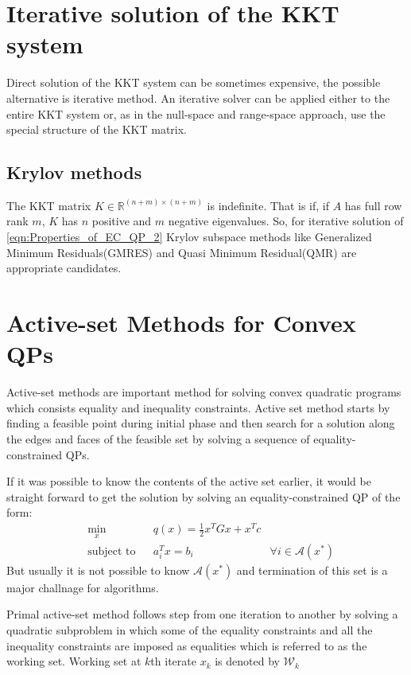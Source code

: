 \section{Iterative solution of the KKT system}
Direct solution of the KKT system can be sometimes expensive, the possible alternative is iterative method. An iterative solver can be applied either to the entire KKT system or, as in the null-space and range-space approach, use the special structure of the KKT matrix.
\subsection*{Krylov methods}
The KKT matrix $K\in \mathbb{R}^{(n+m)\times (n+m)}$ is indefinite. That is if, if $A$ has full row rank $m$, $K$ has $n$ positive and $m$ negative eigenvalues. So, for iterative solution of \ref{eqn:Properties_of_EC_QP_2} Krylov subspace methods like Generalized Minimum Residuals(GMRES) and Quasi Minimum Residual(QMR) are appropriate candidates.




\section{Active-set Methods for Convex QPs}
Active-set methods are important method for solving convex quadratic programs which consists equality and inequality constraints. Active set method starts by finding a feasible point during initial phase and then search for a solution along the edges and faces of the feasible set by solving a sequence of equality-constrained QPs.

If it was possible to know the contents of the active set earlier, it would be straight forward to get the solution by solving an equality-constrained QP of the form:
\begin{equation*}
	\begin{aligned}
		& \underset{x}{\text{min}} & & q(x)= \frac{1}{2}x^{T}Gx+x^{T}c \\
& \text{subject to} & &  a_{i}^{T}x = b_i & \forall i\in \mathcal{A}(x^*)
	\end{aligned}
\end{equation*}
But usually it is not possible to know $\mathcal{A}(x^*)$ and termination of this set is a major challnage for algorithms.

Primal active-set method follows step from one iteration to another by solving a quadratic subproblem in which some of the equality constraints and all the inequality constraints are imposed as equalities which is referred to as the working set. Working set at $k$th iterate $x_k$ is denoted by $\mathcal{W}_k$

